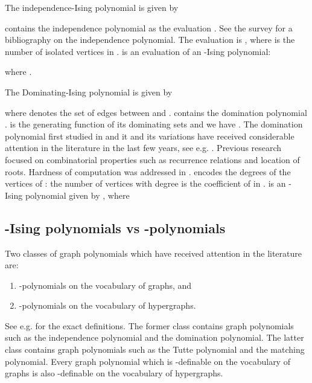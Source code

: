 \documentclass{llncs}
\begin{document}
\begin{example}
 The independence-Ising polynomial
 is given by

 contains the independence polynomial as the evaluation
. See the survey \cite{levit2005independence}
for a bibliography on the independence polynomial. The evaluation
 is , where 
is the number of isolated vertices in .  is an
evaluation of an -Ising polynomial: 

where . 
\end{example}

\begin{example}
 The Dominating-Ising polynomial is
given by  

where  denotes the set of edges between  and .
 contains the domination polynomial . 
is the generating function of its dominating sets and we have .
The domination polynomial first studied in \cite{arocha2000mean}
and it and its variations have received considerable attention in
the literature in the last few years, see e.g. \cite{alikhani2009dominating,akbari2010zeros,akbari2010characterization,alaeiyan2011cyclically,DBLP:journals/combinatorics/KotekPSTT12,DBLP:journals/gc/KotekPT14,DBLP:journals/arscom/AkbariO14,alikhani2014introduction,brown2014roots,kahat2014dominating,DBLP:journals/dmgt/DodKPT15}.
Previous research focused on combinatorial properties such as recurrence
relations and location of roots. Hardness of computation was addressed
in \cite{kotek2013domination}.  encodes the degrees
of the vertices of : the number of vertices with degree  is
the coefficient of  in . 
is an -Ising polynomial given by ,
where 

\end{example}


\subsection{-Ising polynomials vs -polynomials}

Two classes of graph polynomials which have received attention in the literature are:
\begin{enumerate}
 \item -polynomials on the vocabulary of graphs, and
 \item -polynomials on the vocabulary of hypergraphs. 
\end{enumerate}
See e.g. \cite{ar:KM14connection} for the exact definitions. The former class contains graph polynomials such as the independence polynomial
and the domination polynomial. The latter class contains graph polynomials such as the Tutte polynomial and the matching polynomial. 
Every graph polynomial which is -definable on the vocabulary of graphs is also -definable on the vocabulary of hypergraphs. 
\end{document}
